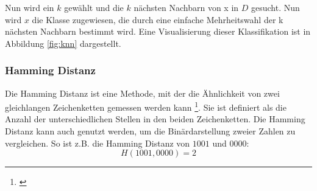 Nun wird ein $k$ gewählt und die $k$ nächsten Nachbarn von x in $D$ gesucht. Nun wird $x$ die Klasse zugewiesen, die durch eine einfache Mehrheitswahl der k nächsten Nachbarn bestimmt wird.
Eine Visualisierung dieser Klassifikation ist in Abbildung \ref{fig:knn} dargestellt.

\subsubsection{Hamming Distanz}
\label{sub:hammingDistanz}

Die Hamming Distanz ist eine Methode, mit der die Ähnlichkeit von zwei gleichlangen Zeichenketten gemessen werden kann \footnote{\cite{hamming}}.
Sie ist definiert als die Anzahl der unterschiedlichen Stellen in den beiden Zeichenketten. 
Die Hamming Distanz kann auch genutzt werden, um die Binärdarstellung zweier Zahlen zu vergleichen. So ist z.B. die Hamming Distanz von $1001$ und $0000$:
\[
H(1001, 0000) = 2
\]






